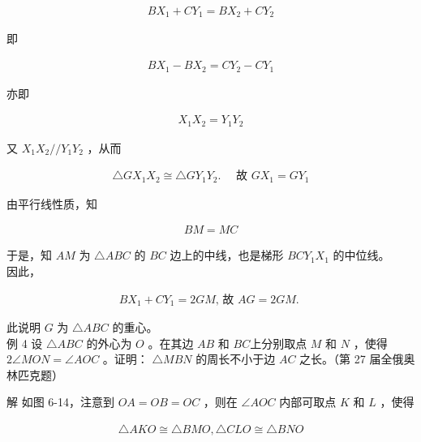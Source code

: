 \documentclass[10pt]{article}
\begin{document}
\begin{align*}
B X_{1}+C Y_{1}=B X_{2}+C Y_{2}
\end{align*}

即

\begin{align*}
B X_{1}-B X_{2}=C Y_{2}-C Y_{1}
\end{align*}

亦即

\begin{align*}
X_{1} X_{2}=Y_{1} Y_{2}
\end{align*}

又 $X_{1} X_{2} / / Y_{1} Y_{2}$ ，从而

\begin{align*}
\triangle G X_{1} X_{2} \cong \triangle G Y_{1} Y_{2} . \quad \text { 故 } G X_{1}=G Y_{1}
\end{align*}

由平行线性质，知

\begin{align*}
B M=M C
\end{align*}

于是，知 $A M$ 为 $\triangle A B C$ 的 $B C$ 边上的中线，也是梯形 $B C Y_{1} X_{1}$ 的中位线。\\
因此，

\begin{align*}
B X_{1}+C Y_{1}=2 G M \text {, 故 } A G=2 G M \text {. }
\end{align*}

此说明 $G$ 为 $\triangle A B C$ 的重心。\\
例 4 设 $\triangle A B C$ 的外心为 $O$ 。在其边 $A B$ 和 $B C$上分别取点 $M$ 和 $N$ ，使得 $2 \angle M O N=\angle A O C$ 。证明： $\triangle M B N$ 的周长不小于边 $A C$ 之长。（第 27 届全俄奥林匹克题）

解 如图 6-14，注意到 $O A=O B=O C$ ，则在 $\angle A O C$ 内部可取点 $K$ 和 $L$ ，使得

\begin{align*}
\triangle A K O \cong \triangle B M O, \triangle C L O \cong \triangle B N O
\end{align*}
\end{document}

